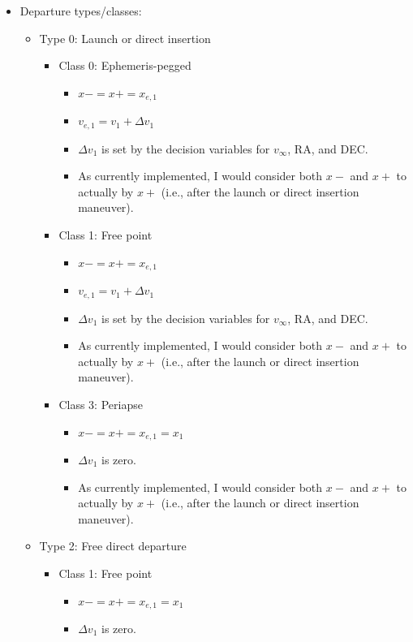 \documentclass[11pt]{article}
\begin{document}
\begin{itemize}
	\item Departure types/classes:
	\begin{itemize}
		\item Type 0: Launch or direct insertion
		\begin{itemize}
			\item Class 0: Ephemeris-pegged
			\begin{itemize}
				\item $x- = x+ = x_{e,1}$
				\item $v_{e,1} = v_1 + \Delta v_1$
				\item $\Delta v_1$ is set by the decision variables for $v_\infty$, RA, and DEC.
				\item As currently implemented, I would consider both $x-$ and $x+$ to actually by $x+$ (i.e., after the launch or direct insertion maneuver).
			\end{itemize}
			\item Class 1: Free point
			\begin{itemize}
				\item $x- = x+ = x_{e,1}$
				\item $v_{e,1} = v_1 + \Delta v_1$
				\item $\Delta v_1$ is set by the decision variables for $v_\infty$, RA, and DEC.
				\item As currently implemented, I would consider both $x-$ and $x+$ to actually by $x+$ (i.e., after the launch or direct insertion maneuver).
			\end{itemize}
			\item Class 3: Periapse
			\begin{itemize}
				\item $x- = x+ = x_{e,1} = x_1$
				\item $\Delta v_1$ is zero.
				\item As currently implemented, I would consider both $x-$ and $x+$ to actually by $x+$ (i.e., after the launch or direct insertion maneuver).
			\end{itemize}
		\end{itemize}
		\item Type 2: Free direct departure
		\begin{itemize}
			\item Class 1: Free point
			\begin{itemize}
				\item $x- = x+ = x_{e,1} = x_1$
				\item $\Delta v_1$ is zero.

\end{itemize}
\end{itemize}
\end{itemize}
\end{itemize}
\end{document}
